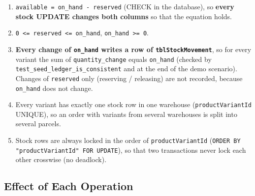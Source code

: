 \begin{enumerate}
\def\labelenumi{\arabic{enumi}.}
\tightlist
\item
  \texttt{available =\allowbreak{} on\_\allowbreak{}hand - reserved} (CHECK in the database),
  so \textbf{every stock UPDATE changes both columns} so that the
  equation holds.
\item
  \texttt{0 \textless{}=\allowbreak{} reserved \textless{}=\allowbreak{} on\_\allowbreak{}hand},
  \texttt{on\_\allowbreak{}hand \textgreater{}\allowbreak{}=\allowbreak{} 0}.
\item
  \textbf{Every change of \texttt{on\_\allowbreak{}hand} writes a row of
  \texttt{tblStockMovement}}, so for every variant the sum of
  \texttt{quantity\_\allowbreak{}change} equals \texttt{on\_\allowbreak{}hand} (checked by
  \texttt{test\_\allowbreak{}seed\_\allowbreak{}ledger\_\allowbreak{}is\_\allowbreak{}consistent} and at the end of the demo
  scenario). Changes of \texttt{reserved} only (reserving / releasing)
  are not recorded, because \texttt{on\_\allowbreak{}hand} does not change.
\item
  Every variant has exactly one stock row in one warehouse
  (\texttt{productVariantId} UNIQUE), so an order with variants from
  several warehouses is split into several parcels.
\item
  Stock rows are always locked in the order of \texttt{productVariantId}
  (\texttt{ORDER BY "productVariantId" FOR UPDATE}), so that two
  transactions never lock each other crosswise (no deadlock).
\end{enumerate}

\hypertarget{effect-of-each-operation}{%
\subsection{Effect of Each Operation}\label{effect-of-each-operation}}

